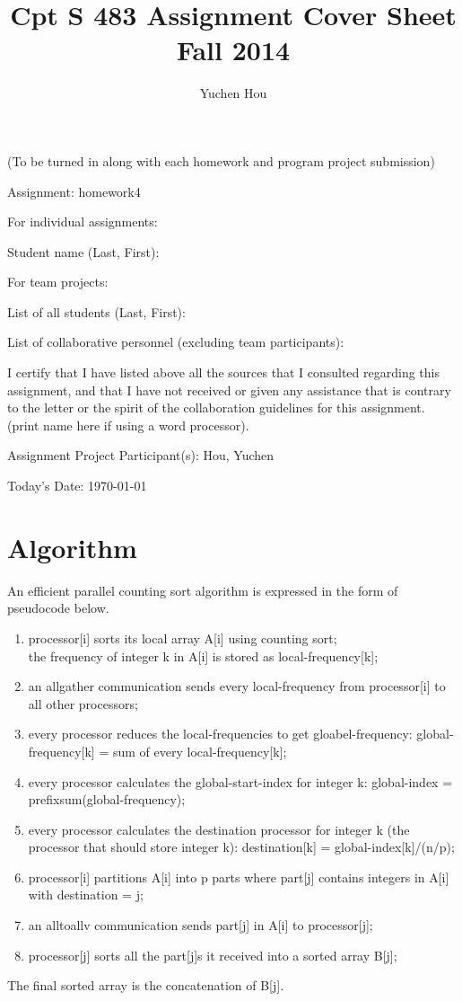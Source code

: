 \documentclass[12pt]{article}
\begin{document}
\title{Cpt S 483 Assignment Cover Sheet \\ Fall 2014
}
\author{Yuchen Hou}
\maketitle

(To be turned in along with each homework and program project submission)

Assignment: homework4

For individual assignments:

Student name (Last, First):

For team projects:

List of all students (Last, First):

List of collaborative personnel (excluding team participants):

I certify that I have listed above all the sources that I consulted regarding this assignment, and that I have not received or given any assistance that is contrary to the letter or the spirit of the collaboration guidelines for this assignment. (print name here if using a word processor).

Assignment Project Participant(s): Hou, Yuchen

Today's Date: \today

\pagebreak

\section{Algorithm}
An efficient parallel counting sort algorithm is expressed in the form of pseudocode below.
\begin{enumerate}
  \item processor[i] sorts its local array A[i] using counting sort;\\
    the frequency of integer k in A[i] is stored as local-frequency[k];
  \item an allgather communication sends every local-frequency from processor[i] to all other processors;
  \item every processor reduces the local-frequencies to get gloabel-frequency: global-frequency[k] = sum of every local-frequency[k];
  \item every processor calculates the global-start-index for integer k: global-index = prefixsum(global-frequency);
  \item every processor calculates the destination processor for integer k (the processor that should store integer k): destination[k] = global-index[k]/(n/p);
  \item processor[i] partitions A[i] into p parts where part[j] contains integers in A[i] with destination = j;
  \item an alltoallv communication sends part[j] in A[i] to processor[j];
  \item processor[j] sorts all the part[j]s it received into a sorted array B[j];
\end{enumerate}
The final sorted array is the concatenation of B[j].
\end{document}
